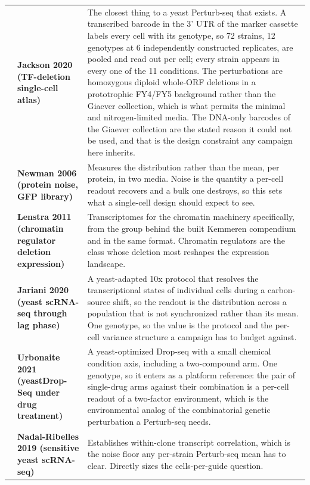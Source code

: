 \begin{longtable}{@{}r@{\hspace{4pt}} L{46mm} L{112mm}@{}}
 & \textbf{Jackson 2020 (TF-deletion single-cell atlas)} & The closest thing to a yeast Perturb-seq that exists. A transcribed barcode in the 3' UTR of the marker cassette labels every cell with its genotype, so 72 strains, 12 genotypes at 6 independently constructed replicates, are pooled and read out per cell; every strain appears in every one of the 11 conditions. The perturbations are homozygous diploid whole-ORF deletions in a prototrophic FY4/FY5 background rather than the Giaever collection, which is what permits the minimal and nitrogen-limited media. The DNA-only barcodes of the Giaever collection are the stated reason it could not be used, and that is the design constraint any campaign here inherits. \\
 & \textbf{Newman 2006 (protein noise, GFP library)} & Measures the distribution rather than the mean, per protein, in two media. Noise is the quantity a per-cell readout recovers and a bulk one destroys, so this sets what a single-cell design should expect to see. \\
 & \textbf{Lenstra 2011 (chromatin regulator deletion expression)} & Transcriptomes for the chromatin machinery specifically, from the group behind the built Kemmeren compendium and in the same format. Chromatin regulators are the class whose deletion most reshapes the expression landscape. \\
 & \textbf{Jariani 2020 (yeast scRNA-seq through lag phase)} & A yeast-adapted 10x protocol that resolves the transcriptional states of individual cells during a carbon-source shift, so the readout is the distribution across a population that is not synchronized rather than its mean. One genotype, so the value is the protocol and the per-cell variance structure a campaign has to budget against. \\
 & \textbf{Urbonaite 2021 (yeastDrop-Seq under drug treatment)} & A yeast-optimized Drop-seq with a small chemical condition axis, including a two-compound arm. One genotype, so it enters as a platform reference: the pair of single-drug arms against their combination is a per-cell readout of a two-factor environment, which is the environmental analog of the combinatorial genetic perturbation a Perturb-seq needs. \\
 & \textbf{Nadal-Ribelles 2019 (sensitive yeast scRNA-seq)} & Establishes within-clone transcript correlation, which is the noise floor any per-strain Perturb-seq mean has to clear. Directly sizes the cells-per-guide question. \\

\end{longtable}

